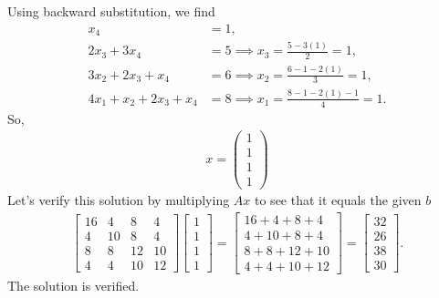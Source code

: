 \documentclass{report}
\begin{document}
    Using backward substitution, we find
    \begin{align*}
        x_{4} &= 1, \\
        2x_{3} + 3x_{4} &= 5 \implies x_{3} = \frac{5-3(1)}{2} = 1, \\
        3x_{2} + 2x_{3} + x_{4} &= 6 \implies x_{2} = \frac{6-1-2(1)}{3} = 1, \\
        4x_{1} + x_{2} + 2x_{3} + x_{4} &= 8 \implies x_{1} = \frac{8-1-2(1)-1}{4} = 1
    .\end{align*}
    So,
    \begin{align*}
        x = \begin{pmatrix} 1 \\ 1 \\ 1 \\ 1 \end{pmatrix}
    \end{align*}
    Let's verify this solution by multiplying $Ax$ to see that it equals the given $b$
    \begin{align*}
        \begin{bmatrix}
            16 & 4 & 8 & 4 \\
            4 & 10 & 8 & 4 \\
            8 & 8 & 12 & 10 \\
            4 & 4 & 10 & 12
        \end{bmatrix}
        \begin{bmatrix}
            1 \\ 1\\ 1 \\1
        \end{bmatrix}
        = 
        \begin{bmatrix}
            16 + 4 + 8 + 4\\
            4 + 10 + 8 + 4 \\
            8 + 8 + 12 + 10 \\
            4 + 4 + 10 + 12 
        \end{bmatrix}
        = 
        \begin{bmatrix}
            32 \\ 26 \\ 38 \\ 30
        \end{bmatrix}
    .\end{align*}
    The solution is verified.
    
\end{document}

